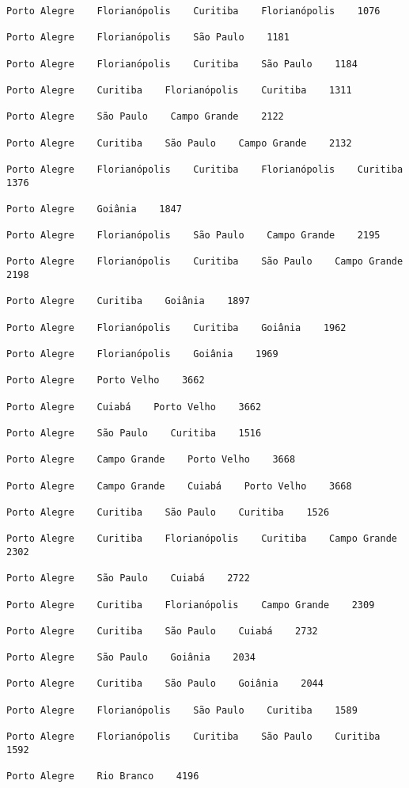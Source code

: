 \begin{verbatim}
Porto Alegre    Florianópolis    Curitiba    Florianópolis    1076

Porto Alegre    Florianópolis    São Paulo    1181

Porto Alegre    Florianópolis    Curitiba    São Paulo    1184

Porto Alegre    Curitiba    Florianópolis    Curitiba    1311

Porto Alegre    São Paulo    Campo Grande    2122

Porto Alegre    Curitiba    São Paulo    Campo Grande    2132

Porto Alegre    Florianópolis    Curitiba    Florianópolis    Curitiba    1376

Porto Alegre    Goiânia    1847

Porto Alegre    Florianópolis    São Paulo    Campo Grande    2195

Porto Alegre    Florianópolis    Curitiba    São Paulo    Campo Grande    2198

Porto Alegre    Curitiba    Goiânia    1897

Porto Alegre    Florianópolis    Curitiba    Goiânia    1962

Porto Alegre    Florianópolis    Goiânia    1969

Porto Alegre    Porto Velho    3662

Porto Alegre    Cuiabá    Porto Velho    3662

Porto Alegre    São Paulo    Curitiba    1516

Porto Alegre    Campo Grande    Porto Velho    3668

Porto Alegre    Campo Grande    Cuiabá    Porto Velho    3668

Porto Alegre    Curitiba    São Paulo    Curitiba    1526

Porto Alegre    Curitiba    Florianópolis    Curitiba    Campo Grande    2302

Porto Alegre    São Paulo    Cuiabá    2722

Porto Alegre    Curitiba    Florianópolis    Campo Grande    2309

Porto Alegre    Curitiba    São Paulo    Cuiabá    2732

Porto Alegre    São Paulo    Goiânia    2034

Porto Alegre    Curitiba    São Paulo    Goiânia    2044

Porto Alegre    Florianópolis    São Paulo    Curitiba    1589

Porto Alegre    Florianópolis    Curitiba    São Paulo    Curitiba    1592

Porto Alegre    Rio Branco    4196
\end{verbatim}

